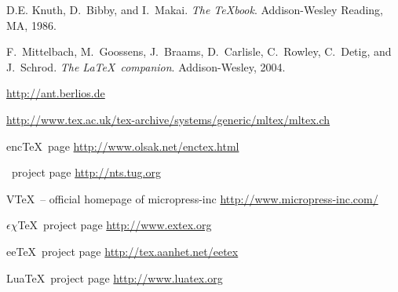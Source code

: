 \documentclass{scrartcl}
\begin{document}
\clearpage
\normalsize
\begin{thebibliography}{10}
\label{sec:refs}

\vspace{2ex}
\vspace{1ex}
D.E. Knuth, D.~Bibby, and I.~Makai.
\newblock \emph{{The \TeX book}}.
\newblock Addison-Wesley Reading, MA, 1986.

F.~Mittelbach, M.~Goossens, J.~Braams, D.~Carlisle, C.~Rowley, C.~Detig, and
  J.~Schrod.
\newblock \emph{{The \LaTeX\ companion}}.
\newblock Addison-Wesley, 2004.

\vspace{2ex}
\vspace{1ex}
\vspace{1ex}

\newblock \url{http://ant.berlios.de}

\newblock \url{http://www.tex.ac.uk/tex-archive/systems/generic/mltex/mltex.ch}

{enc\TeX\ page}
\newblock \url{http://www.olsak.net/enctex.html}

{\NTS\ project page}
\newblock \url{http://nts.tug.org}

{V\TeX\ – official homepage of micropress-inc}
\newblock \url{http://www.micropress-inc.com/}

{$\epsilon\chi$\TeX\ project page}
\newblock \url{http://www.extex.org}

{ee\TeX\ project page}
\newblock \url{http://tex.aanhet.net/eetex}

{Lua\TeX\ project page}
\newblock \url{http://www.luatex.org}


\end{thebibliography}
\end{document}
